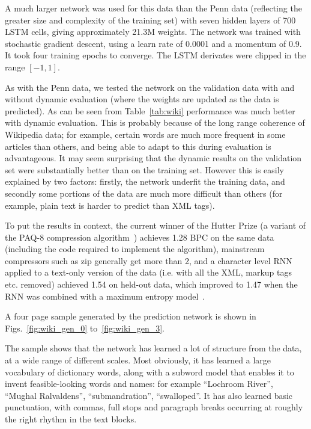 A much larger network was used for this data than the Penn data (reflecting the greater size and complexity of the training set) with seven hidden layers of 700 LSTM cells, giving approximately 21.3M weights. The network was trained with stochastic gradient descent, using a learn rate of 0.0001 and a momentum of 0.9. It took four training epochs to converge. The LSTM derivates were clipped in the range $[-1,1]$.

As with the Penn data, we tested the network on the validation data with and without dynamic evaluation (where the weights are updated as the data is predicted). As can be seen from Table~\ref{tab:wiki} performance was much better with dynamic evaluation. This is probably because of the long range coherence of Wikipedia data; for example, certain words are much more frequent in some articles than others, and being able to adapt to this during evaluation is advantageous. It may seem surprising that the dynamic results on the validation set were substantially better than on the training set. However this is easily explained by two factors: firstly, the network underfit the training data, and secondly some portions of the data are much more difficult than others (for example, plain text is harder to predict than XML tags).

To put the results in context, the current winner of the Hutter Prize (a variant of the PAQ-8 compression algorithm~\cite{knoll11paq}) achieves 1.28 BPC on the same data (including the code required to implement the algorithm), mainstream compressors such as zip generally get more than 2, and a character level RNN applied to a text-only version of the data (i.e. with all the XML, markup tags etc. removed) achieved 1.54 on held-out data, which improved to 1.47 when the RNN was combined with a maximum entropy model~\cite{mikolov12subword}. 

A four page sample generated by the prediction network is shown in Figs.~\ref{fig:wiki_gen_0} to~\ref{fig:wiki_gen_3}.

The sample shows that the network has learned a lot of structure from the data, at a wide range of different scales. Most obviously, it has learned a large vocabulary of dictionary words, along with a subword model that enables it to invent feasible-looking words and names: for example ``Lochroom River'', ``Mughal Ralvaldens'', ``submandration'', ``swalloped''. It has also learned basic punctuation, with commas, full stops and paragraph breaks occurring at roughly the right rhythm in the text blocks.

